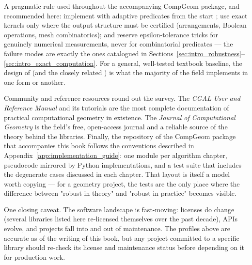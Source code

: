 A pragmatic rule used throughout the accompanying CompGeom package, and
recommended here: implement with adaptive predicates from the start
\cite{shewchuk1997}; use exact kernels only where the output structure
must be certified (arrangements, Boolean operations, mesh combinatorics);
and reserve epsilon-tolerance tricks for genuinely numerical
measurements, never for combinatorial predicates --- the failure modes
are exactly the ones catalogued in
Sections~\ref{sec:intro_robustness}--\ref{sec:intro_exact_computation}.
For a general, well-tested textbook baseline, the design of
\cite{deberg2008} (and the closely related \cite{berg2008}) is what the
majority of the field implements in one form or another.

Community and reference resources round out the survey. The \emph{CGAL
User and Reference Manual} and its tutorials \cite{cgalmanual} are the
most complete documentation of practical computational geometry in
existence. The \emph{Journal of Computational Geometry} \cite{jocg} is
the field's free, open-access journal and a reliable source of the
theory behind the libraries. Finally, the repository of the CompGeom
package that accompanies this book follows the conventions described in
Appendix~\ref{app:implementation_guide}: one module per algorithm
chapter, pseudocode mirrored by Python implementations, and a test suite
that includes the degenerate cases discussed in each chapter. That
layout is itself a model worth copying --- for a geometry project, the
tests are the only place where the difference between "robust in theory"
and "robust in practice" becomes visible.

One closing caveat. The software landscape is fast-moving: licenses do
change (several libraries listed here re-licensed themselves over the
past decade), APIs evolve, and projects fall into and out of
maintenance. The profiles above are accurate as of the writing of this
book, but any project committed to a specific library should re-check
its license and maintenance status before depending on it for
production work.
